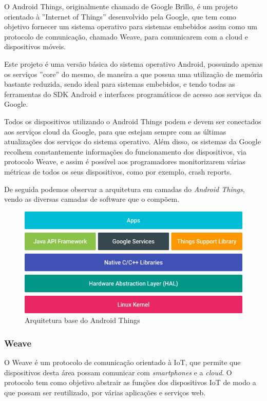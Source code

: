 O Android Things, originalmente chamado de Google Brillo, é um projeto orientado à ''Internet of Things'' desenvolvido pela Google, que tem como objetivo fornecer um sistema operativo para sistemas embebidos assim como um protocolo de comunicação, chamado Weave, para comunicarem com a cloud e dispositivos móveis.

Este projeto é uma versão básica do sistema operativo Android, possuindo apenas os serviços ''core'' do mesmo, de maneira a que possua uma utilização de memória bastante reduzida, sendo ideal para sistemas embebidos, e tendo todas as ferramentas do SDK Android e interfaces programáticos de acesso aos serviços da Google.

Todos os dispositivos utilizando o Android Things podem e devem ser conectados aos serviços cloud da Google, para que estejam sempre com as últimas atualizações dos serviços do sistema operativo. Além disso, os sistemas da Google recolhem constantemente informações do funcionamento dos dispositivos, via protocolo Weave, e assim é possível aos programadores monitorizarem várias métricas de todos os seus dispositivos, como por exemplo, crash reports.

De seguida podemos observar a arquitetura em camadas do \textit{Android Things}, vendo as diversas camadas de software que o compõem.

\begin{figure}[H]
  \centering
        \includegraphics[scale=0.5]{img/platform-architecture-and-things.png}
  \caption{Arquitetura base do Android Things}
\end{figure}

\subsubsection{Weave}

O Weave é um protocolo de comunicação orientado à IoT, que permite que dispositivos desta área possam comunicar com \textit{smartphones} e a \textit{cloud}. O protocolo tem como objetivo abstrair as funções dos dispositivos IoT de modo a que possam ser reutilizado, por várias aplicações e serviços web.

